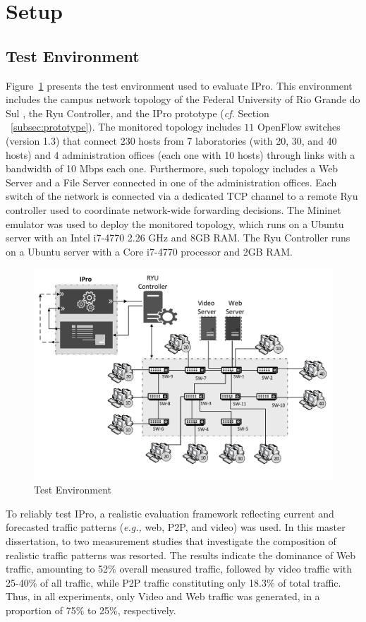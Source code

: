 \section{Setup}
\label{sec:setup}

\subsection{Test Environment}
\label{subsec:test_enviroment}

Figure~\ref{fig:campus_topo} presents the test environment used to evaluate IPro. This environment includes the campus network topology of the Federal University of Rio Grande do Sul \cite{isolani_2015:interactive}, the Ryu Controller, and the IPro prototype (\textit{cf.} Section ~\ref{subsec:prototype}). The monitored topology includes $11$ OpenFlow switches (version 1.3) that connect $230$ hosts from 7 laboratories (with 20, 30, and 40 hosts) and 4 administration offices (each one with 10 hosts) through links with a bandwidth of 10 Mbps each one. Furthermore, such topology includes a Web Server and a File Server connected in one of the administration offices. Each switch of the network is connected via a dedicated TCP channel to a remote Ryu controller used to coordinate network-wide forwarding decisions. The Mininet emulator \cite{lantz_2010:mininet} was used to deploy the monitored topology, which runs on a Ubuntu server with an Intel i7-4770 2.26 GHz and 8GB RAM. The Ryu Controller runs on a Ubuntu server with a Core i7-4770 processor and 2GB RAM.

\begin{figure}[H]
    \centering
    \includegraphics[width=0.75\columnwidth]{figures/Fig4-topology}
    \caption{Test Environment}
    \label{fig:campus_topo}
\end{figure}

To reliably test IPro, a realistic evaluation framework reflecting current and forecasted traffic patterns (\textit{e.g.,} web, P2P, and video) was used. In this master dissertation, to two measurement studies that investigate the composition of realistic traffic patterns \cite{labovitz_2011:interdomain, maier_2009:dominant} was resorted. The results indicate the dominance of Web traffic, amounting to 52\% overall measured traffic, followed by video traffic with 25-40\% of all traffic, while P2P traffic constituting only 18.3\% of total traffic. Thus, in all experiments, only Video and Web traffic was generated, in a proportion of 75\% to 25\%, respectively.\\

